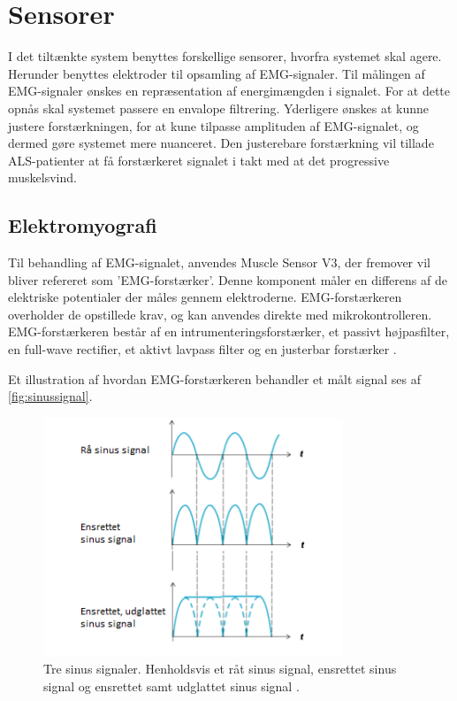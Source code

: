 \section{Sensorer} \label{sec:sensorer}
I det tiltænkte system benyttes forskellige sensorer, hvorfra systemet skal agere. Herunder benyttes elektroder til opsamling af EMG-signaler. Til målingen af EMG-signaler ønskes en repræsentation af energimængden i signalet. For at dette opnås skal systemet passere en envalope filtrering. Yderligere ønskes at kunne justere forstærkningen, for at kune tilpasse amplituden af EMG-signalet, og dermed gøre systemet mere nuanceret. Den justerebare forstærkning vil tillade ALS-patienter at få forstærkeret signalet i takt med at det progressive muskelsvind. 

\subsection{Elektromyografi}
Til behandling af EMG-signalet, anvendes Muscle Sensor V3, der fremover vil bliver refereret som 'EMG-forstærker'. Denne komponent måler en differens af de elektriske potentialer der måles gennem elektroderne. EMG-forstærkeren overholder de opstillede krav, og kan anvendes direkte med mikrokontrolleren. EMG-forstærkeren består af en intrumenteringsforstærker, et passivt højpasfilter, en full-wave rectifier, et aktivt lavpass filter og en justerbar forstærker \citep{advancertech2013}. 

Et illustration af hvordan EMG-forstærkeren behandler et målt signal ses af \autoref{fig:sinussignal}.
\begin{figure}[H]
\centering
\includegraphics[width=0.8\textwidth]{figures/sinussignal.png}
\caption{Tre sinus signaler. Henholdsvis et råt sinus signal, ensrettet sinus signal og ensrettet samt udglattet sinus signal \citep{advancertech2013}.}
\label{fig:sinussignal}
\end{figure}

